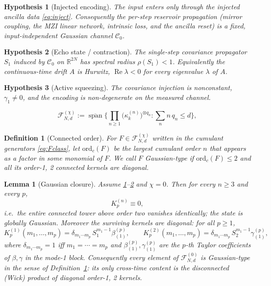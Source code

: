 \documentclass[10pt,a4paper]{amsart}
\newtheorem{hypothesis}{Hypothesis}
\newtheorem{definition}{Definition}
\newtheorem{lemma}{Lemma}
\newcommand{\Cz}{\mathcal{C}_0}
\newcommand{\Fclass}[2]{\mathcal{F}^{(#1)}_{#2}}
\newcommand{\ordc}{\mathrm{ord}_c}
\begin{document}
\begin{hypothesis}[Injected encoding]\label{H1}
The input enters only through the injected ancilla data \eqref{eq:inject}.
Consequently the per-step reservoir propagation (mirror coupling, the MZI linear
network, intrinsic loss, and the ancilla reset) is a fixed, input-independent
Gaussian channel $\Cz$.
\end{hypothesis}

\begin{hypothesis}[Echo state / contraction]\label{H2}
The single-step covariance propagator $S_1$ induced by $\Cz$ on
$\mathbb{R}^{2N}$ has spectral radius $\rho(S_1)<1$. Equivalently the
continuous-time drift $A$ is Hurwitz, $\operatorname{Re}\lambda<0$ for every
eigenvalue $\lambda$ of $A$.
\end{hypothesis}

\begin{hypothesis}[Active squeezing]\label{H4}
The covariance injection is nonconstant, $\gamma_1\neq0$, and the encoding is
non-degenerate on the measured channel.
\end{hypothesis}

\begin{equation}
\Fclass{\chi}{N,d} := \overline{\operatorname{span}}
\Big\{\textstyle\prod_{n\ge1}\big(\kappa^{(n)}_k\big)^{\otimes q_n}:
\textstyle\sum_n n\,q_n\le d\Big\},
\label{eq:Fclass}
\end{equation}

\begin{definition}[Connected order]\label{def:ordc}
For $F\in\Fclass{\chi}{N,d}$ written in the cumulant generators \eqref{eq:Fclass},
let $\ordc(F)$ be the largest cumulant order $n$ that appears as a factor in some
monomial of $F$. We call $F$ \emph{Gaussian-type} if $\ordc(F)\le 2$ and all its
order-1, 2 connected kernels are diagonal.
\end{definition}

\begin{lemma}[Gaussian closure]\label{lem:gauss}
Assume \ref{H1}--\ref{H2} and $\chi=0$. Then for every $n\ge3$ and every $p$,
\[
K^{(n)}_p\equiv0,
\]
i.e.\ the entire connected tower above order two vanishes identically; the state
is globally Gaussian. Moreover the surviving kernels are diagonal: for all
$p\ge1$,
\[
K^{(1)}_p(m_1,\dots,m_p)=\delta_{m_1\cdots m_p}\,S_1^{m_1-1}\beta^{(p)}_{(1)},
\qquad
K^{(2)}_p(m_1,\dots,m_p)=\delta_{m_1\cdots m_p}\,S_2^{m_1-1}\gamma^{(p)}_{(1)},
\]
where $\delta_{m_1\cdots m_p}=1$ iff $m_1=\cdots=m_p$ and
$\beta^{(p)}_{(1)},\gamma^{(p)}_{(1)}$ are the $p$-th Taylor coefficients of
$\beta,\gamma$ in the mode-1 block. Consequently every element of
$\Fclass{0}{N,d}$ is Gaussian-type in the sense of
Definition~\ref{def:ordc}: its only cross-time content is the disconnected (Wick)
product of diagonal order-1, 2 kernels.
\end{lemma}
\end{document}

